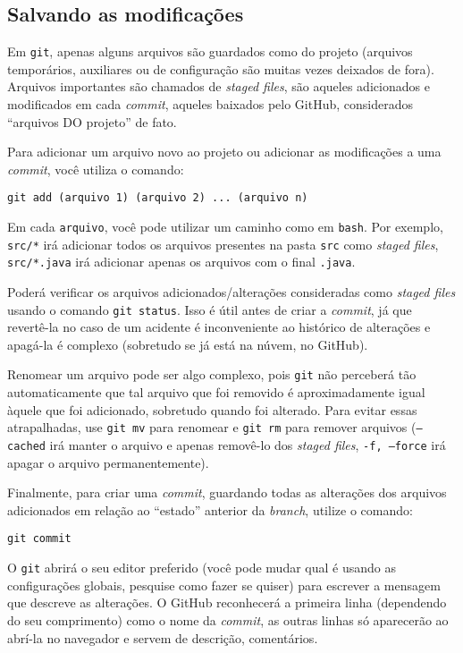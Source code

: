 \documentclass[a4paper,oneside,10pt]{memoir}
\begin{document}
\subsection{Salvando as modificações}

Em \texttt{git}, apenas alguns arquivos são guardados como do projeto (arquivos
temporários, auxiliares ou de configuração são muitas vezes deixados de fora).
Arquivos importantes são chamados de \emph{staged files}, são aqueles
adicionados e modificados em cada \emph{commit}, aqueles baixados pelo GitHub,
considerados ``arquivos DO projeto'' de fato.

Para adicionar um arquivo novo ao projeto ou adicionar as modificações a uma
\emph{commit}, você utiliza o comando:

\begin{center}
\texttt{git add (arquivo 1) (arquivo 2) ... (arquivo n)}
\end{center}

Em cada \texttt{arquivo}, você pode utilizar um caminho como em \texttt{bash}.
Por exemplo, \texttt{src/*} irá adicionar todos os arquivos presentes na pasta
\texttt{src} como \emph{staged files}, \texttt{src/*.java} irá adicionar apenas
os arquivos com o final \texttt{.java}.

Poderá verificar os arquivos adicionados/alterações consideradas como
\emph{staged files} usando o comando \texttt{git status}. Isso é útil antes de
criar a \emph{commit}, já que revertê-la no caso de um acidente é inconveniente
ao histórico de alterações e apagá-la é complexo (sobretudo se já está na
núvem, no GitHub).

Renomear um arquivo pode ser algo complexo, pois \texttt{git} não perceberá tão
automaticamente que tal arquivo que foi removido é aproximadamente igual àquele
que foi adicionado, sobretudo quando foi alterado. Para evitar essas
atrapalhadas, use \texttt{git mv} para renomear e \texttt{git rm} para
remover arquivos (\texttt{--cached} irá manter o arquivo e apenas removê-lo dos
\emph{staged files}, \texttt{-f, --force} irá apagar o arquivo permanentemente).

Finalmente, para criar uma \emph{commit}, guardando todas as alterações dos
arquivos adicionados em relação ao ``estado'' anterior da \emph{branch},
utilize o comando:

\begin{center}
\texttt{git commit}
\end{center}

O \texttt{git} abrirá o seu editor preferido (você pode mudar qual é usando as
configurações globais, pesquise como fazer se quiser) para escrever a mensagem
que descreve as alterações. O GitHub reconhecerá a primeira linha (dependendo
do seu comprimento) como o nome da \emph{commit}, as outras linhas só
aparecerão ao abrí-la no navegador e servem de descrição, comentários.
\end{document}
